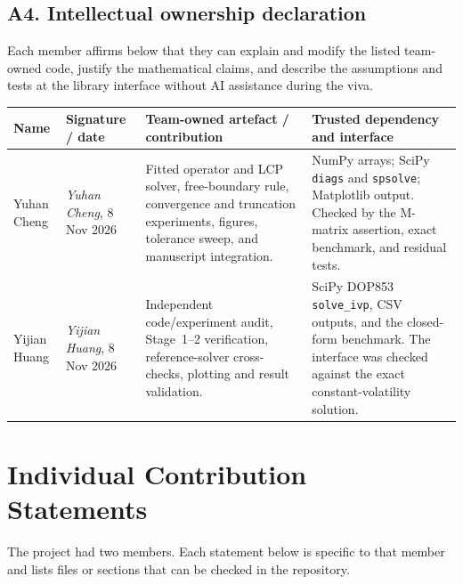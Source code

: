 \documentclass[11pt,a4paper]{article}
\theoremstyle{definition}
\theoremstyle{remark}
\begin{document}
\subsection*{A4. Intellectual ownership declaration}
Each member affirms below that they can explain and modify the listed
team-owned code, justify the mathematical claims, and describe the assumptions
and tests at the library interface without AI assistance during the viva.
\begin{table}[H]
\centering
\scriptsize
\setlength{\tabcolsep}{4pt}
\begin{tabular}{@{}p{2.1cm}p{2.5cm}p{5.2cm}p{4.1cm}@{}}
\toprule
\textbf{Name} & \textbf{Signature / date} & \textbf{Team-owned artefact / contribution} &
\textbf{Trusted dependency and interface} \\
\midrule
Yuhan Cheng & \textit{Yuhan Cheng}, 8 Nov 2026 &
Fitted operator and LCP solver, free-boundary rule, convergence and truncation
experiments, figures, tolerance sweep, and manuscript integration. &
NumPy arrays; SciPy \texttt{diags} and \texttt{spsolve}; Matplotlib output.
Checked by the M-matrix assertion, exact benchmark, and residual tests. \\
Yijian Huang & \textit{Yijian Huang}, 8 Nov 2026 &
Independent code/experiment audit, Stage~1--2 verification, reference-solver
cross-checks, plotting and result validation. &
SciPy DOP853 \texttt{solve\_ivp}, CSV outputs, and the closed-form benchmark.
The interface was checked against the exact constant-volatility solution. \\
\bottomrule
\end{tabular}
\end{table}

\newpage
\section{Individual Contribution Statements}
\label{app:ics}

The project had two members. Each statement below is specific to that member
and lists files or sections that can be checked in the repository.
\end{document}
